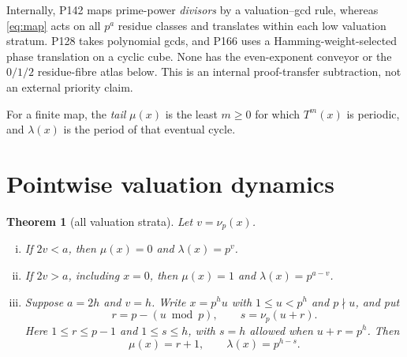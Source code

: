 \documentclass[a4paper,10pt]{amsart}
\newtheorem{theorem}{Theorem}[section]
\theoremstyle{remark}
\newcommand{\vp}{\nu_p}
\begin{document}
Internally, P142 maps prime-power \emph{divisors} by a valuation--gcd rule,
whereas \eqref{eq:map} acts on all $p^a$ residue classes and translates within
each low valuation stratum.  P128 takes polynomial gcds, and P166 uses a
Hamming-weight-selected phase translation on a cyclic cube.  None has the
even-exponent conveyor or the $0/1/2$ residue-fibre atlas below.  This is an
internal proof-transfer subtraction, not an external priority claim.

For a finite map, the \emph{tail} $\mu(x)$ is the least $m\geq0$ for which
$T^m(x)$ is periodic, and $\lambda(x)$ is the period of that eventual cycle.

\section{Pointwise valuation dynamics}

\begin{theorem}[all valuation strata]\label{thm:strata}
Let $v=\vp(x)$.
\begin{enumerate}[(i)]
\item If $2v<a$, then $\mu(x)=0$ and $\lambda(x)=p^v$.
\item If $2v>a$, including $x=0$, then
      $\mu(x)=1$ and $\lambda(x)=p^{a-v}$.
\item Suppose $a=2h$ and $v=h$.  Write $x=p^hu$ with
      $1\leq u<p^h$ and $p\nmid u$, and put
      \begin{equation}\label{eq:rs}
       r=p-(u\bmod p),\qquad s=\vp(u+r).
      \end{equation}
      Here $1\leq r\leq p-1$ and $1\leq s\leq h$, with $s=h$ allowed when
      $u+r=p^h$.  Then
      \begin{equation}\label{eq:middle-orbit}
       \mu(x)=r+1,\qquad \lambda(x)=p^{h-s}.
      \end{equation}
\end{enumerate}
\end{theorem}
\end{document}
